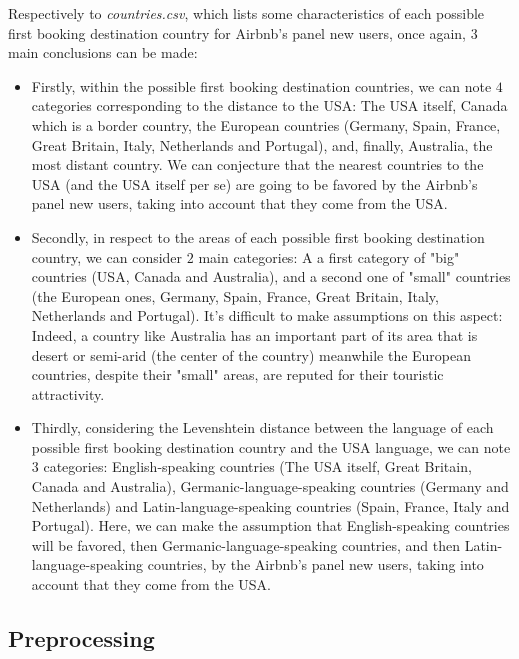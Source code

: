 \documentclass[twocolumn, switch]{article}
\begin{document}
Respectively to \textit{countries.csv}, which lists some characteristics of each possible first booking destination country for Airbnb's panel new users, once again, $3$ main conclusions can be made:
\begin{itemize}
\item Firstly, within the possible first booking destination countries, we can note $4$ categories corresponding to the distance to the USA: The USA itself, Canada which is a border country, the European countries (Germany, Spain, France, Great Britain, Italy, Netherlands and Portugal), and, finally, Australia, the most distant country. We can conjecture that the nearest countries to the USA (and the USA itself per se) are going to be favored by the Airbnb's panel new users, taking into account that they come from the USA.
\item Secondly, in respect to the areas of each possible first booking destination country, we can consider $2$ main categories: A a first category of "big" countries (USA, Canada and Australia), and a second one of "small" countries (the European ones, Germany, Spain, France, Great Britain, Italy, Netherlands and Portugal). It's difficult to make assumptions on this aspect: Indeed, a country like Australia has an important part of its area that is desert or semi-arid (the center of the country) meanwhile the European countries, despite their "small" areas, are reputed for their touristic attractivity.
\item Thirdly, considering the Levenshtein distance between the language of each possible first booking destination country and the USA language, we can note $3$ categories: English-speaking countries (The USA itself, Great Britain, Canada and Australia), Germanic-language-speaking countries (Germany and Netherlands) and Latin-language-speaking countries (Spain, France, Italy and Portugal). Here, we can make the assumption that English-speaking countries will be favored, then Germanic-language-speaking countries, and then Latin-language-speaking countries, by the Airbnb's panel new users, taking into account that they come from the USA.
\end{itemize}

\subsection{Preprocessing}
\end{document}
